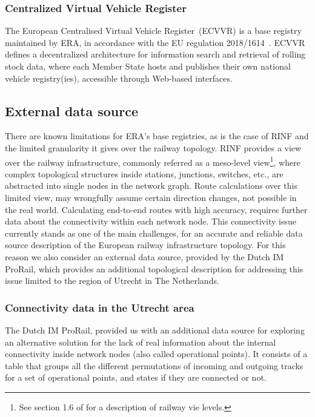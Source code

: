 \subsubsection{Centralized Virtual Vehicle Register}
The European Centralised Virtual Vehicle Register~(ECVVR)
is a base registry maintained by ERA,
in accordance with the EU regulation 2018/1614~\cite{eu-1614-2018}.
ECVVR defines a decentralized architecture
for information search and retrieval of rolling stock data,
where each Member State hosts and publishes their own national vehicle registry(ies),
accessible through Web-based interfaces.

\subsection{External data source}
There are known limitations for ERA's base registries,
as is the case of RINF and the limited granularity
it gives over the railway topology.
RINF provides a view over the railway infrastructure,
commonly referred as a meso-level view\footnote{See section 1.6 of \cite{irs30100} for a description of railway vie levels.},
where complex topological structures inside stations, junctions, switches, etc.,
are abstracted into single nodes in the network graph.
Route calculations over this limited view,
may wrongfully assume certain direction changes,
not possible in the real world.
Calculating end-to-end routes with high accuracy,
requires further data about the connectivity within each network node.
This connectivity issue currently stands as one of the main challenges,
for an accurate and reliable data source
description of the European railway infrastructure topology.
For this reason we also consider an external data source,
provided by the Dutch IM ProRail,
which provides an additional topological description
for addressing this issue limited to the region of Utrecht in The Netherlands.

\subsubsection{Connectivity data in the Utrecht area}
The Dutch IM ProRail, provided us with an additional data source
for exploring an alternative solution for the lack of real information
about the internal connectivity inside network nodes (also called operational points).
It consists of a table that groups all the different permutations of incoming
and outgoing tracks for a set of operational points, and states if they are connected or not.

